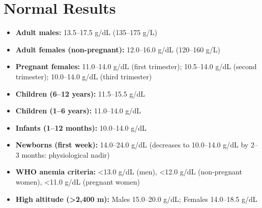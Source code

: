 \section*{Normal Results}
\begin{itemize}
  \item \textbf{Adult males:} 13.5--17.5 g/dL (135--175 g/L) \cite{fischbach2023manual}
  \item \textbf{Adult females (non-pregnant):} 12.0--16.0 g/dL (120--160 g/L)
  \item \textbf{Pregnant females:} 11.0--14.0 g/dL (first trimester); 10.5--14.0 g/dL (second trimester); 10.0--14.0 g/dL (third trimester)
  \item \textbf{Children (6--12 years):} 11.5--15.5 g/dL
  \item \textbf{Children (1--6 years):} 11.0--14.0 g/dL
  \item \textbf{Infants (1--12 months):} 10.0--14.0 g/dL
  \item \textbf{Newborns (first week):} 14.0--24.0 g/dL (decreases to 10.0--14.0 g/dL by 2--3 months: physiological nadir)
  \item \textbf{WHO anemia criteria:} <13.0 g/dL (men), <12.0 g/dL (non-pregnant women), <11.0 g/dL (pregnant women)
  \item \textbf{High altitude (>2,400 m):} Males 15.0--20.0 g/dL; Females 14.0--18.5 g/dL
\end{itemize}

